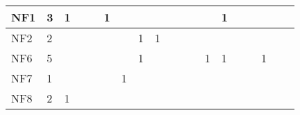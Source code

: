 \begin{table}[]
{\begin{tabular}{|l|l|l|l|l|l|l|l|l|l|l|l|l|l|l|l|l|l|l|}
NF1  & 3                                                     & 1                                                &    &    & 1  &    &                                                  &    &    &    &    &                                                   & 1  &                                                   &    &                                                             &                                                             &                                                             \\ \hline
NF2  & 2                                                     &                                                  &    &    &    &    & 1                                                & 1  &    &    &    &                                                   &    &                                                   &    &                                                             &                                                             &                                                             \\ \hline
NF6  & 5                                                     &                                                  &    &    &    &    & 1                                                &    &    &    &    & 1                                                 & 1  &                                                   &    & 1                                                           &                                                             &                                                             \\ \hline
NF7  & 1                                                     &                                                  &    &    &    & 1  &                                                  &    &    &    &    &                                                   &    &                                                   &    &                                                             &                                                             &                                                             \\ \hline
NF8  & 2                                                     & 1                                                &    &    &    &    &                                                  &    &    &    &    &                                                   &    &                                                   &    &                                                             &                                                             &                                                             \\ \hline

\end{tabular}}
\end{table}
